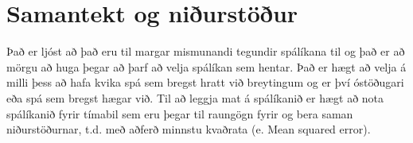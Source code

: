\section {Samantekt og niðurstöður}

Það er ljóst að það eru til margar mismunandi tegundir spálíkana til og það er að mörgu að huga þegar að þarf að velja spálíkan sem hentar. Það er hægt að velja á milli þess að hafa kvika spá sem bregst hratt við breytingum og er því óstöðugari eða spá sem bregst hægar við. Til að leggja mat á spálíkanið er hægt að nota spálíkanið fyrir tímabil sem eru þegar til raungögn fyrir og bera saman niðurstöðurnar, t.d. með aðferð minnstu kvaðrata (e. Mean squared error).